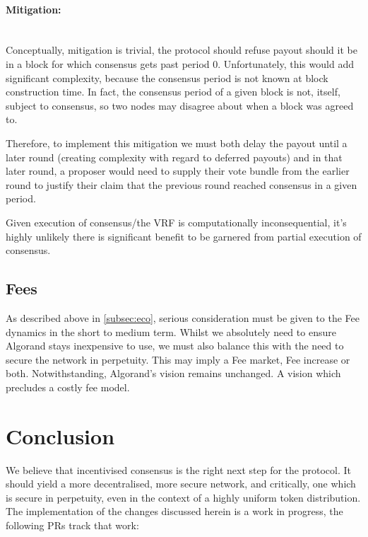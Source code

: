 \documentclass[11pt,a4paper]{article}
\begin{document}
\paragraph{Mitigation:} \mbox{}\\
Conceptually, mitigation is trivial, the protocol should refuse payout should it be in a block for which consensus gets 
past period 0. Unfortunately, this would add significant complexity, because the consensus period is not known at block 
construction time. In fact, the consensus period of a given block is not, itself, subject to consensus, so two nodes may 
disagree about when a block was agreed to.

Therefore, to implement this mitigation we must both delay the payout until a later round (creating complexity with 
regard to deferred payouts) and in that later round, a proposer would need to supply their vote bundle from the earlier 
round to justify their claim that the previous round reached consensus in a given period.

Given execution of consensus/the VRF is computationally inconsequential, it's highly unlikely there is significant 
benefit to be garnered from partial execution of consensus.


\pagebreak

\subsection{Fees}
As described above in \ref{subsec:eco}, serious consideration must be given to the Fee dynamics in the short to medium 
term. Whilst we absolutely need to ensure Algorand stays inexpensive to use, we must also balance this with the need
to secure the network in perpetuity. This may imply a Fee market, Fee increase or both. Notwithstanding, Algorand's 
vision remains unchanged. A vision which precludes a costly fee model.

\pagebreak

\section{Conclusion}
We believe that incentivised consensus is the right next step for the protocol. It should yield a more decentralised,  
more secure network, and critically, one which is secure in perpetuity, even in the context of a highly uniform token
distribution. \\ 

The implementation of the changes discussed herein is a work in progress, the following PRs track that work:
\end{document}
